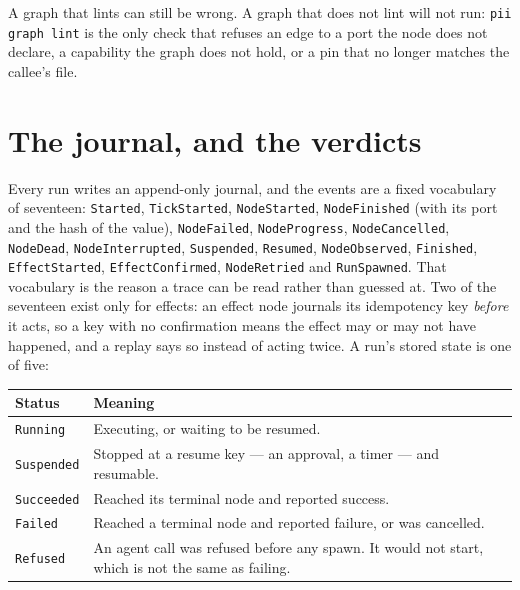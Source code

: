 A graph that lints can still be wrong. A graph that does not lint will not run:
\texttt{pii graph lint} is the only check that refuses an edge to a port the node does not
declare, a capability the graph does not hold, or a pin that no longer matches the
callee's file.

\section{The journal, and the verdicts}

Every run writes an append-only journal, and the events are a fixed vocabulary of
seventeen: \texttt{Started}, \texttt{TickStarted}, \texttt{NodeStarted},
\texttt{NodeFinished} (with its port and the hash of the value), \texttt{NodeFailed},
\texttt{NodeProgress}, \texttt{NodeCancelled}, \texttt{NodeDead}, \texttt{NodeInterrupted},
\texttt{Suspended}, \texttt{Resumed}, \texttt{NodeObserved}, \texttt{Finished},
\texttt{EffectStarted}, \texttt{EffectConfirmed}, \texttt{NodeRetried} and
\texttt{RunSpawned}. That vocabulary is the reason a trace can be read rather than guessed
at. Two of the seventeen exist only for effects: an effect node journals its idempotency
key \emph{before} it acts, so a key with no confirmation means the effect may or may not
have happened, and a replay says so instead of acting twice. A run's stored state is one
of five:

\begin{center}
\begin{tabular}{@{}p{}p{}@{}}
	\toprule
	\textbf{Status} & \textbf{Meaning} \\
	\midrule
	\texttt{Running} & Executing, or waiting to be resumed. \\
	\texttt{Suspended} & Stopped at a resume key --- an approval, a timer --- and resumable. \\
	\texttt{Succeeded} & Reached its terminal node and reported success. \\
	\texttt{Failed} & Reached a terminal node and reported failure, or was cancelled. \\
	\texttt{Refused} & An agent call was refused before any spawn. It would not start,
	which is not the same as failing. \\
	\bottomrule
\end{tabular}
\end{center}

